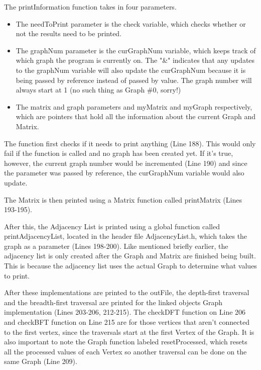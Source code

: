 \documentclass[letterpaper, 10pt]{article}
\begin{document}
\vspace{1em}

\noindent
The printInformation function takes in four parameters.
\begin{itemize}
    \item The needToPrint parameter is the check variable, which checks whether or not the results need to be printed.
    \item The graphNum parameter is the curGraphNum variable, which keeps track of which graph the program is currently on. The "\&" indicates that any updates to the graphNum variable will also update the curGraphNum because it is being passed by reference instead of passed by value. The graph number will always start at 1 (no such thing as Graph \#0, sorry!) 
    \item The matrix and graph parameters and myMatrix and myGraph respectively, which are pointers that hold all the information about the current Graph and Matrix.
\end{itemize}

\noindent
The function first checks if it needs to print anything (Line 188). This would only fail if the function is called and no graph has been created yet. If it's true, however, the current graph number would be incremented (Line 190) and since the parameter was passed by reference, the curGraphNum variable would also update. 

\vspace{1em}
\noindent
The Matrix is then printed using a Matrix function called printMatrix (Lines 193-195). 

\vspace{1em}
\noindent
After this, the Adjacency List is printed using a global function called printAdjacencyList, located in the header file AdjacencyList.h, which takes the graph as a parameter (Lines 198-200). Like mentioned briefly earlier, the adjacency list is only created after the Graph and Matrix are finished being built. This is because the adjacency list uses the actual Graph to determine what values to print. 

\vspace{1em}
\noindent
After these implementations are printed to the outFile, the depth-first traversal and the breadth-first traversal are printed for the linked objects Graph implementation (Lines 203-206, 212-215). The checkDFT function on Line 206 and checkBFT function on Line 215 are for those vertices that aren't connected to the first vertex, since the traversals start at the first Vertex of the Graph. It is also important to note the Graph function labeled resetProcessed, which resets all the processed values of each Vertex so another traversal can be done on the same Graph (Line 209).
\end{document}
